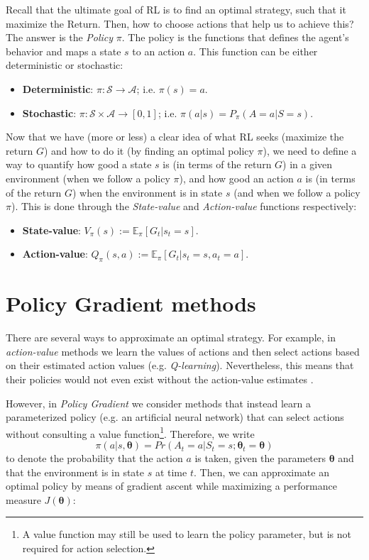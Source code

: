 \documentclass[twoside,twocolumn]{article}
\begin{document}
Recall that the ultimate goal of RL is to find an optimal strategy, such that it maximize the Return. Then, how to choose actions that help us to achieve this? The answer is the \emph{Policy} $\pi$. The policy is the functions that defines the agent’s behavior and maps a state $s$ to an action $a$. This function can be either deterministic or stochastic:

\begin{itemize}
  \item \textbf{Deterministic}: $\pi: \mathcal{S} \rightarrow \mathcal{A}$; i.e. $\pi(s)=a$.
  \item \textbf{Stochastic}: $\pi: \mathcal{S} \times \mathcal{A} \rightarrow [0, 1]$; i.e. $\pi(a|s)=P_{\pi}(A=a|S=s)$.
\end{itemize}

Now that we have (more or less) a clear idea of what RL seeks (maximize the return $G$) and how to do it (by finding an optimal policy $\pi$), we need to define a way to quantify how good a state $s$ is (in terms of the return $G$) in a given environment (when we follow a policy $\pi$), and how good an action $a$ is (in terms of the return $G$) when the environment is in state $s$ (and when we follow a policy $\pi$). This is done through the \emph{State-value} and \emph{Action-value} functions respectively:
\begin{itemize}
    \item \textbf{State-value}: $V_{\pi}(s):= \mathbb{E}_{\pi}[G_t|s_t=s]$.
    \item \textbf{Action-value}: $Q_{\pi}(s, a):= \mathbb{E}_{\pi}[G_t|s_t=s, a_t=a]$.
\end{itemize}


\section{Policy Gradient methods}

There are several ways to approximate an optimal strategy. For example, in \emph{action-value} methods we learn the values of actions and then select
actions based on their estimated action values (e.g. \textit{Q-learning}). Nevertheless, this means that their policies would not even exist without the action-value estimates \cite{Sutton1998}.

However, in \emph{Policy Gradient} we consider methods that instead learn a parameterized policy (e.g. an artificial neural network) that can select actions without consulting a value function\footnote{A value function may still be used to learn the policy parameter, but is not required for action selection.}.
Therefore, we write
$$\pi(a|s,\boldsymbol{\theta}) = Pr(A_t=a | S_t=s; \boldsymbol{\theta}_t=\boldsymbol{\theta})$$
 to denote the probability that the action $a$ is taken, given the parameters $\boldsymbol{\theta}$ and that the environment is in state $s$ at time $t$.
Then, we can approximate an optimal policy by means of gradient ascent while maximizing a performance measure $J(\boldsymbol{\theta})$:
\end{document}

